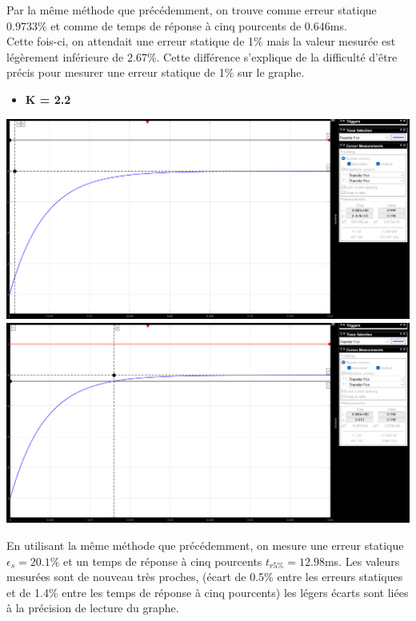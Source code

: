 \documentclass[12pt]{article}
\begin{document}
\normalsize Par la même méthode que précédemment, on trouve comme erreur statique $0.9733\%$ et comme de temps de réponse à cinq pourcents de $0.646$ms.
\\Cette fois-ci, on attendait une erreur statique de 1$\%$ mais la valeur mesurée est légèrement inférieure de 2.67$\%$. Cette différence s'explique de la difficulté d'être précis pour mesurer une erreur statique de 1$\%$ sur le graphe.

\newpage\begin{itemize}
    \item \bf \large K = 2.2
\end{itemize}
\begin{center}
    \includegraphics[width = 16 cm]{TP2 Simulink/Syst_1/Err_statique_syst_1_K=2.2.png}
    \includegraphics[width = 16 cm]{TP2 Simulink/Syst_1/tr5prct_syst_1_K=2.2.png}
\end{center}
\normalsize En utilisant la même méthode que précédemment, on mesure une erreur statique $\epsilon_s = 20.1\%$ et un temps de réponse à cinq pourcents $t_{r5\%} = 12.98$ms.
Les valeurs mesurées sont de nouveau très proches, (écart de 0.5$\%$ entre les erreurs statiques et de 1.4$\%$ entre les temps de réponse à cinq pourcents) les légers écarts sont liées à la précision de lecture du graphe.
\end{document}
